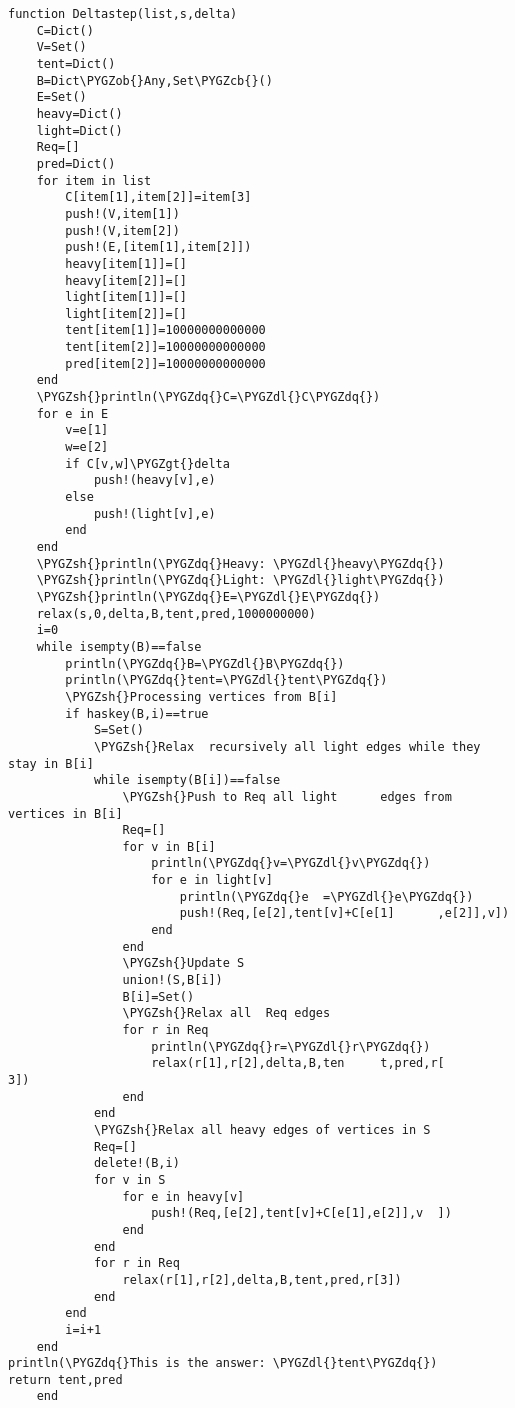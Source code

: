 \documentclass[letterpaper,10pt,english]{sphinxmanual}
\def\PYGZob{\char`\{}
\def\PYGZcb{\char`\}}
\def\PYGZgt{\char`\>}
\def\PYGZsh{\char`\#}
\def\PYGZdl{\char`\$}
\def\PYGZdq{\char`\"}
\begin{document}
\begin{Verbatim}[commandchars=\\\{\}]
    function Deltastep(list,s,delta)
    C=Dict()
    V=Set()
    tent=Dict()
    B=Dict\PYGZob{}Any,Set\PYGZcb{}()
    E=Set()
    heavy=Dict()
    light=Dict()
    Req=[]
    pred=Dict()
    for item in list
        C[item[1],item[2]]=item[3]
        push!(V,item[1])
        push!(V,item[2])
        push!(E,[item[1],item[2]])
        heavy[item[1]]=[]
        heavy[item[2]]=[]
        light[item[1]]=[]
        light[item[2]]=[]
        tent[item[1]]=10000000000000
        tent[item[2]]=10000000000000
        pred[item[2]]=10000000000000
    end
    \PYGZsh{}println(\PYGZdq{}C=\PYGZdl{}C\PYGZdq{})
    for e in E
        v=e[1]
        w=e[2]
        if C[v,w]\PYGZgt{}delta
            push!(heavy[v],e)
        else
            push!(light[v],e)
        end
    end
    \PYGZsh{}println(\PYGZdq{}Heavy: \PYGZdl{}heavy\PYGZdq{})
    \PYGZsh{}println(\PYGZdq{}Light: \PYGZdl{}light\PYGZdq{})
    \PYGZsh{}println(\PYGZdq{}E=\PYGZdl{}E\PYGZdq{})
    relax(s,0,delta,B,tent,pred,1000000000)
    i=0
    while isempty(B)==false
        println(\PYGZdq{}B=\PYGZdl{}B\PYGZdq{})
        println(\PYGZdq{}tent=\PYGZdl{}tent\PYGZdq{})
        \PYGZsh{}Processing vertices from B[i]
        if haskey(B,i)==true
            S=Set()
            \PYGZsh{}Relax  recursively all light edges while they stay in B[i]
            while isempty(B[i])==false
                \PYGZsh{}Push to Req all light      edges from      vertices in B[i]
                Req=[]
                for v in B[i]
                    println(\PYGZdq{}v=\PYGZdl{}v\PYGZdq{})
                    for e in light[v]
                        println(\PYGZdq{}e  =\PYGZdl{}e\PYGZdq{})
                        push!(Req,[e[2],tent[v]+C[e[1]      ,e[2]],v])
                    end
                end
                \PYGZsh{}Update S
                union!(S,B[i])
                B[i]=Set()
                \PYGZsh{}Relax all  Req edges
                for r in Req
                    println(\PYGZdq{}r=\PYGZdl{}r\PYGZdq{})
                    relax(r[1],r[2],delta,B,ten     t,pred,r[       3])
                end
            end
            \PYGZsh{}Relax all heavy edges of vertices in S
            Req=[]
            delete!(B,i)
            for v in S
                for e in heavy[v]
                    push!(Req,[e[2],tent[v]+C[e[1],e[2]],v  ])
                end
            end
            for r in Req
                relax(r[1],r[2],delta,B,tent,pred,r[3])
            end
        end
        i=i+1
    end
println(\PYGZdq{}This is the answer: \PYGZdl{}tent\PYGZdq{})
return tent,pred
    end
\end{Verbatim}
\end{document}
